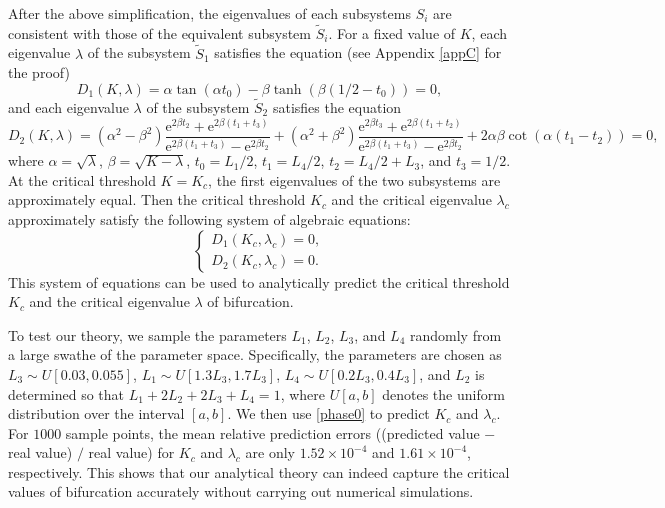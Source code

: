 \documentclass[a4paper,11pt]{article}
\begin{document}
After the above simplification, the eigenvalues of each subsystems $S_i$ are consistent with those of the equivalent subsystem $\tilde{S}_i$. For a fixed value of $K$, each eigenvalue $\lambda$ of the subsystem $\tilde{S}_1$ satisfies the equation (see Appendix \ref{appC} for the proof)
\begin{equation*}
D_1(K, \lambda) = \alpha \tan(\alpha t_0) - \beta \tanh(\beta (1/2 - t_0)) = 0,
\end{equation*}
and each eigenvalue $\lambda$ of the subsystem $\tilde{S}_2$ satisfies the equation
\begin{equation*}
D_2(K, \lambda) = (\alpha^2 - \beta^2)\frac{\mathrm{e}^{2 \beta t_2} + \mathrm{e}^{2 \beta (t_1+t_3)}}
{\mathrm{e}^{2 \beta (t_1+t_3)} - \mathrm{e}^{2 \beta t_2}}
+ (\alpha^2 + \beta^2)\frac{\mathrm{e}^{2 \beta t_3} + \mathrm{e}^{2 \beta (t_1+t_2)}}{\mathrm{e}^{2 \beta (t_1+t_3)} - \mathrm{e}^{2 \beta t_2}} + 2 \alpha \beta \cot(\alpha (t_1 - t_2)) = 0,
\end{equation*}
where $\alpha = \sqrt{\lambda}$, $\beta = \sqrt{K - \lambda}$, $t_0 = L_1 / 2$, $t_1 = L_4 / 2$, $t_2 = L_4 / 2 + L_3$, and $t_3 = 1 / 2$. At the critical threshold $K = K_c$, the first eigenvalues of the two subsystems are approximately equal. Then the critical threshold $K_c$ and the critical eigenvalue $\lambda_c$ approximately satisfy the following system of algebraic equations:
\begin{equation}\label{phase0}
\left\{
\begin{split}
D_1(K_c, \lambda_c) = 0, \\
D_2(K_c, \lambda_c) = 0.
\end{split}
\right.
\end{equation}
This system of equations can be used to analytically predict the critical threshold $K_c$ and the critical eigenvalue $\lambda$ of bifurcation.

To test our theory, we sample the parameters $L_1$, $L_2$, $L_3$, and $L_4$ randomly from a large swathe of the parameter space. Specifically, the parameters are chosen as $L_3 \sim U[0.03, 0.055]$, $L_1 \sim U[1.3 L_3, 1.7 L_3]$, $L_4 \sim U[0.2 L_3, 0.4 L_3]$, and $L_2$ is determined so that $L_1 + 2 L_2 + 2 L_3 + L_4 = 1$, where $U[a,b]$ denotes the uniform distribution over the interval $[a,b]$. We then use \eqref{phase0} to predict $K_c$ and $\lambda_c$. For $1000$ sample points, the mean relative prediction errors ((predicted value $-$ real value) $/$ real value) for $K_c$ and $\lambda_c$ are only $1.52 \times 10^{-4}$ and $1.61 \times 10^{-4}$, respectively. This shows that our analytical theory can indeed capture the critical values of bifurcation accurately without carrying out numerical simulations.
\end{document}
